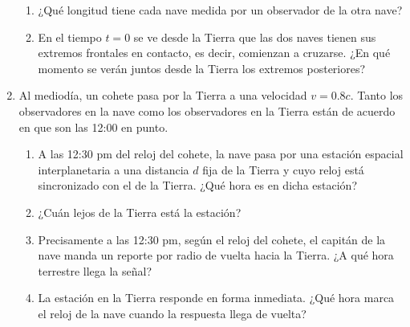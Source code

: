 \documentclass[letterpaper,11pt]{article}
\begin{document}
\begin{enumerate}
\begin{enumerate}
        \item ¿Qué longitud tiene cada nave medida por un observador de la otra nave?

        \item En el tiempo $t=0$ se ve desde la Tierra que las dos naves tienen sus extremos frontales en contacto, es decir, comienzan a cruzarse. ¿En qué momento se verán juntos desde la Tierra los extremos posteriores?
    \end{enumerate}

\item Al mediodía, un cohete pasa por la Tierra a una velocidad $v=0.8 c$. Tanto los observadores en la nave como los observadores en la Tierra están de acuerdo en que son las 12:00 en punto. 

    \begin{enumerate}
        \item A las 12:30 pm del reloj del cohete, la nave pasa por una estación espacial interplanetaria a una distancia $d$ fija de la Tierra y cuyo reloj está sincronizado con el de la Tierra. ¿Qué hora es en dicha estación?

        \item ¿Cuán lejos de la Tierra está la estación?

        \item Precisamente a las 12:30 pm, según el reloj del cohete, el capitán de la nave manda un reporte por radio de vuelta hacia la Tierra. ¿A qué hora terrestre llega la señal?

        \item La estación en la Tierra responde en forma inmediata. ¿Qué hora marca el reloj de la nave cuando la respuesta llega de vuelta?
    \end{enumerate}

\end{enumerate}
\end{document}

